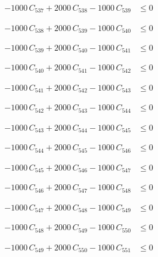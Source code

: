 \documentclass[a4paper,11pt]{article}
\begin{document}
\begin{align}
-1000\,C_{537} + 2000\,C_{538} - 1000\,C_{539} &\leq 0 \nonumber
\end{align}

\begin{align}
-1000\,C_{538} + 2000\,C_{539} - 1000\,C_{540} &\leq 0 \nonumber
\end{align}

\begin{align}
-1000\,C_{539} + 2000\,C_{540} - 1000\,C_{541} &\leq 0 \nonumber
\end{align}

\begin{align}
-1000\,C_{540} + 2000\,C_{541} - 1000\,C_{542} &\leq 0 \nonumber
\end{align}

\begin{align}
-1000\,C_{541} + 2000\,C_{542} - 1000\,C_{543} &\leq 0 \nonumber
\end{align}

\begin{align}
-1000\,C_{542} + 2000\,C_{543} - 1000\,C_{544} &\leq 0 \nonumber
\end{align}

\begin{align}
-1000\,C_{543} + 2000\,C_{544} - 1000\,C_{545} &\leq 0 \nonumber
\end{align}

\begin{align}
-1000\,C_{544} + 2000\,C_{545} - 1000\,C_{546} &\leq 0 \nonumber
\end{align}

\begin{align}
-1000\,C_{545} + 2000\,C_{546} - 1000\,C_{547} &\leq 0 \nonumber
\end{align}

\begin{align}
-1000\,C_{546} + 2000\,C_{547} - 1000\,C_{548} &\leq 0 \nonumber
\end{align}

\begin{align}
-1000\,C_{547} + 2000\,C_{548} - 1000\,C_{549} &\leq 0 \nonumber
\end{align}

\begin{align}
-1000\,C_{548} + 2000\,C_{549} - 1000\,C_{550} &\leq 0 \nonumber
\end{align}

\begin{align}
-1000\,C_{549} + 2000\,C_{550} - 1000\,C_{551} &\leq 0 \nonumber
\end{align}
\end{document}
